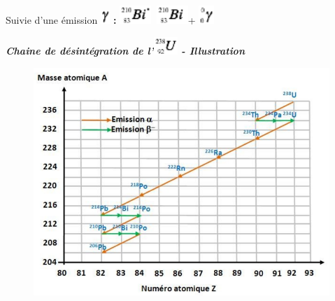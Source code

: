 Suivie d'une émission
\includegraphics[width=0.354cm,height=0.495cm]{Pictures/100000010000000A0000000EB444449CB8FB105E.png}\textbf{
:
}\includegraphics[width=1.177cm,height=0.683cm]{Pictures/100000010000002100000013F4346A116177CC55.png}
\includegraphics[width=1.177cm,height=0.683cm]{Pictures/100000010000002100000013061F8CC345B56CF4.png}+
\includegraphics[width=0.565cm,height=0.683cm]{Pictures/10000001000000100000001384CE4DB1D643C8F9.png}

\emph{\textbf{Chaine de désintégration de
l'}}\includegraphics[width=0.918cm,height=0.683cm]{Pictures/100000010000001A000000137145F016F0439DB0.png}\textbf{
}\emph{\textbf{- Illustration}}

\begin{figure}
\centering
\includegraphics[width=11.204cm,height=8.608cm]{Pictures/10000001000002E90000023C8DC9DA56C35BDFC0.png}
\caption{}
\end{figure}

